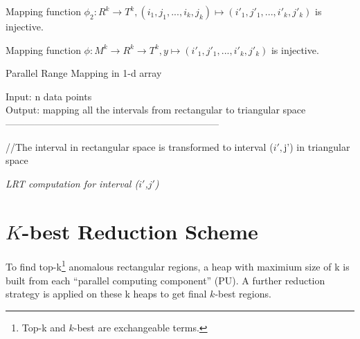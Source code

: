 \documentclass[AMA,LATO1COL]{WileyNJD-v2}
\begin{document}
\begin{lemma}
Mapping function $\phi_2:   R^k \rightarrow  T^k, (i_1,j_1,...,i_k,j_k) \mapsto (i'_1,j'_1,...,i'_k,j'_k)$ is injective.
\end{lemma}

\begin{corollary}
Mapping function $\phi:   M^k \rightarrow R^k \rightarrow  T^k,y \mapsto (i'_1,j'_1,...,i'_k,j'_k)$ is injective.
\end{corollary}



\begin{algorithm}[t!]
\label{RM}
\caption{ Parallel Range Mapping in 1-d array}\label{RM}
Input:  n data points \\
Output: mapping all the intervals from rectangular to triangular space\\
------------------------------------------------------------------ \\
\begin{algorithmic}[1]
\State //The interval  in rectangular space is transformed to interval ($i',$j') in triangular space
\Else
{}

\EndIf
\EndIf
\State \textit {LRT computation for interval (${i\prime}$,${j\prime}$)}
\EndFor
\EndFor
\end{algorithmic}
\end{algorithm}

\section{ $K$-best Reduction Scheme}\label{KBEST}
To find top-k\footnote{Top-k and $k$-best are exchangeable terms.} anomalous rectangular regions, a heap with maximium size of k is built from each ``parallel computing component'' (PU). A further reduction strategy is applied on these k heaps to get final $k$-best regions.
\end{document}
